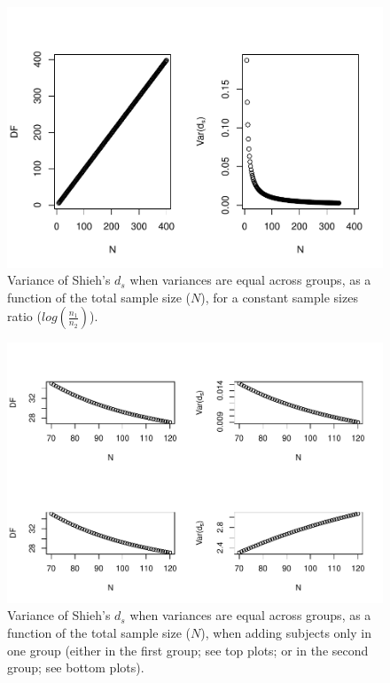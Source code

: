 \documentclass[
  english,
  man,mask]{apa6}
\begin{document}
\begin{figure}
\centering
\includegraphics{Theoretical-Variance-of-all-estimators-as-a-function-of-population-parameters_files/figure-latex/varshiehhomNsize2-1.pdf}
\caption{\label{fig:varshiehhomNsize2}Variance of Shieh's \(d_s\) when variances are equal across groups, as a function of the total sample size (\(N\)), for a constant sample sizes ratio (\(log\left(\frac{n_1}{n_2} \right)\)).}
\end{figure}

\begin{figure}
\centering
\includegraphics{Theoretical-Variance-of-all-estimators-as-a-function-of-population-parameters_files/figure-latex/varshiehhomNsize4-1.pdf}
\caption{\label{fig:varshiehhomNsize4}Variance of Shieh's \(d_s\) when variances are equal across groups, as a function of the total sample size (\(N\)), when adding subjects only in one group (either in the first group; see top plots; or in the second group; see bottom plots).}
\end{figure}
\end{document}
